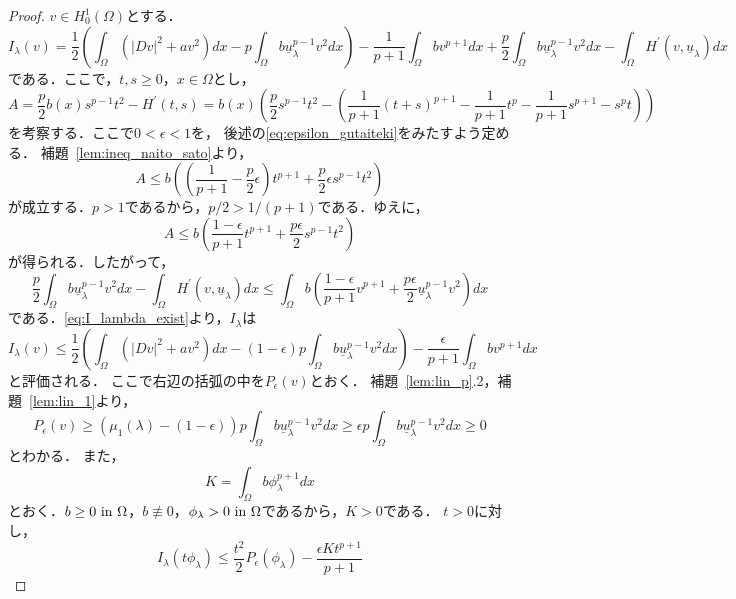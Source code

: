 \begin{proof}
 $v \in H^1_0(\Omega)$とする．
 \begin{equation}
  I_\lambda (v) = \frac{1}{2} \left( \int_\Omega \left( \lvert Dv
                                                  \rvert^2 + a v^2
                                                 \right) dx - p
  \int_\Omega b \underline{u}_\lambda^{p-1} v^2 dx \right) -
  \frac{1}{p+1} \int_\Omega b v^{p+1} dx + \frac{p}{2} \int_\Omega b
  \underline{u}_\lambda ^{p-1} v^2 dx - \int_\Omega H^\prime (v,
  \underline{u}_\lambda) dx \label{eq:I_lambda_exist}
 \end{equation}
 である．ここで，$t, s \geq 0$，$x \in \Omega$とし，
 \[
 A = \frac{p}{2} b(x) s^{p-1} t^2 - H^\prime(t, s) = b(x) \left(
 \frac{p}{2} s^{p-1} t^2 - \left(\frac{1}{p+1} (t+s)^{p+1} -
 \frac{1}{p+1}t^p - \frac{1}{p+1} s^{p+1} - s^p t \right) \right)
 \]
 を考察する．ここで$0 < \epsilon < 1$を，
 後述の\eqref{eq:epsilon_gutaiteki}をみたすよう定める．
 補題~\ref{lem:ineq_naito_sato}より，
 \[
 A \leq b \left( \left( \frac{1}{p+1} - \frac{p}{2} \epsilon \right)
 t^{p+1} + \frac{p}{2}\epsilon s^{p-1} t^2 \right)
 \]
 が成立する．$p > 1$であるから，$p/2 > 1/(p+1)$である．ゆえに，
 \[
 A \leq b \left( \frac{1 - \epsilon}{p+1} t^{p+1} +
 \frac{p\epsilon}{2} s^{p-1} t^2 \right)
 \]
 が得られる．したがって，
 \[
 \frac{p}{2} \int_\Omega b \underline{u}_\lambda^{p-1} v^2 dx -
 \int_\Omega H^\prime (v, \underline{u}_\lambda) dx \leq \int_\Omega b
 \left( \frac{1-\epsilon}{p+1} v^{p+1} + \frac{p \epsilon}{2}
 \underline{u}_\lambda ^{p-1} v^2 \right) dx
 \]
 である．\eqref{eq:I_lambda_exist}より，$I_\lambda$は
 \[
 I_\lambda(v) \leq \frac{1}{2} \left( \int_\Omega \left( \lvert Dv
 \rvert^{2} + a v^2\right)dx - (1 -\epsilon)p \int_\Omega b
 \underline{u}_\lambda^{p-1} v^2 dx \right) - \frac{\epsilon}{p+1}
 \int_\Omega bv^{p+1} dx
\]
 と評価される．
 ここで右辺の括弧の中を$P_\epsilon(v)$とおく．
 補題~\ref{lem:lin_p}.2，補題~\ref{lem:lin_1}より，
 \[
  P_\epsilon(v) \geq \left(\mu_1(\lambda) - (1 - \epsilon) \right) p
 \int_\Omega b
 \underline{u}_\lambda^{p-1} v^2 dx \geq \epsilon p 
 \int_\Omega b
 \underline{u}_\lambda^{p-1} v^2 dx \geq 0
 \]
 とわかる．
 また，
 \begin{equation}
  K = \int_\Omega b \phi_\lambda^{p+1} dx \label{eq:intbphi}
 \end{equation}
 とおく．$b \geq 0 ~\text{in}~ \Omega$，$b \not\equiv 0$，$\phi_\lambda > 0
 ~\text{in}~ \Omega$であるから，$K > 0$である．
 $t > 0$に対し，
 \[
 I_\lambda (t \phi_\lambda) \leq \frac{t^2}{2} P_\epsilon
 (\phi_\lambda) - \frac{\epsilon K t^{p+1}}{p+1}
\]
\end{proof}

